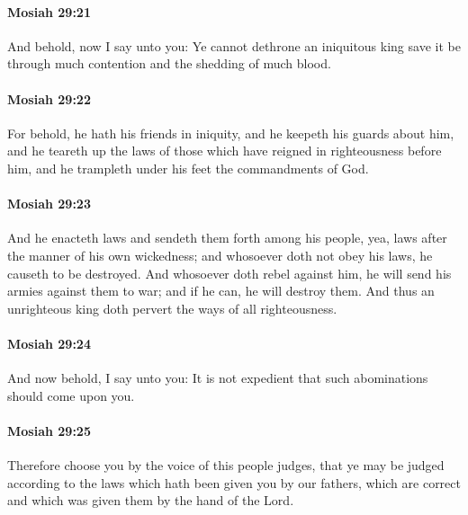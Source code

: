 		\paragraph{Mosiah 29:21} %
			\label{MOSIAH-29-21}

			And behold, now I say unto you:
			Ye cannot dethrone an iniquitous king
			save it be through much contention and the shedding of much blood.

		\paragraph{Mosiah 29:22} %
			\label{MOSIAH-29-22}

			For behold, he hath his friends in iniquity,
			and he keepeth his guards about him,
			and he teareth up the laws of those
			which have reigned in righteousness before him,
			and he trampleth under his feet the commandments of God.

		\paragraph{Mosiah 29:23} %
			\label{MOSIAH-29-23}

			And he enacteth laws and sendeth them forth among his people,
			yea, laws after the manner of his own wickedness;
			and whosoever doth not obey his laws,
			he causeth to be destroyed.
			And whosoever doth rebel against him,
			he will send his armies against them to war;
			and if he can, he will destroy them.
			And thus an unrighteous king doth pervert the ways of all righteousness.

		\paragraph{Mosiah 29:24} %
			\label{MOSIAH-29-24}

			And now behold, I say unto you:
			It is not expedient that such abominations should come upon you.

		\paragraph{Mosiah 29:25} %
			\label{MOSIAH-29-25}

			Therefore choose you by the voice of this people judges,
			that ye may be judged according to the laws
			which hath been given you by our fathers,
			which are correct
			and which was given them by the hand of the Lord.

